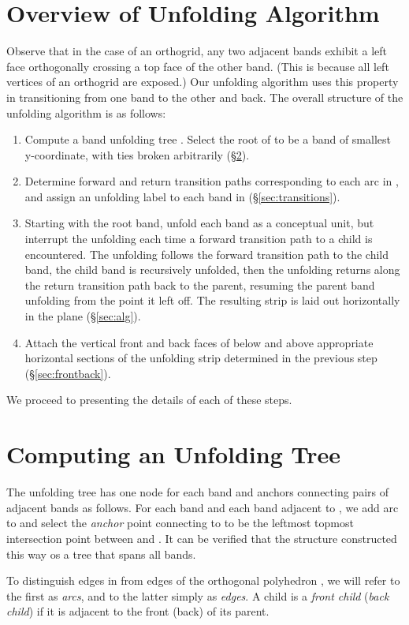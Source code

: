 \documentclass[11pt]{article}
\begin{document}
\section{Overview of Unfolding Algorithm}
\label{sec:unfidea}
Observe that in the case of an orthogrid, any two adjacent bands exhibit a left face orthogonally crossing a top face of the other band. (This is because all left vertices of an orthogrid are exposed.) Our unfolding algorithm uses this property in transitioning from one band to the other and back. 
The overall structure of the unfolding algorithm is as follows:
\begin{enumerate}
\item Compute a band unfolding tree . Select the root of  to be a band of smallest y-coordinate, with ties broken arbitrarily (\S\ref{sec:unftree}).
\item Determine forward and return transition paths corresponding to each arc in , and assign an unfolding label to each band in  (\S\ref{sec:transitions}).
\item Starting with the root band, unfold each band as a conceptual unit, but interrupt the unfolding each time a forward transition path to a child is encountered. The unfolding follows the forward transition path to the child band, the child band is recursively unfolded, then the unfolding returns along the return transition  path back to the parent, resuming the parent band unfolding from the point it left off. The resulting strip is laid out horizontally in the plane (\S\ref{sec:alg}).
\item Attach the vertical front and back faces of  below and above appropriate horizontal sections of the unfolding strip determined in the previous step (\S\ref{sec:frontback}).
\end{enumerate}
We proceed to presenting the details of each of these steps.

\section{Computing an Unfolding Tree }
\label{sec:unftree}
The unfolding tree  has one node for each band and anchors connecting pairs of adjacent bands as follows. For each band  and each band  adjacent to , we add arc  to  and select the \emph{anchor} point connecting  to  to be the  leftmost topmost intersection point between  and .  It can be verified that the structure  constructed this way os a tree that spans all bands.

To distinguish edges in  from edges of the orthogonal polyhedron , we will refer to
the first as \emph{arcs}, and to the latter simply as \emph{edges}. A child is a \emph{front child} (\emph{back child}) if it is adjacent to the front (back) of its parent.
\end{document}
